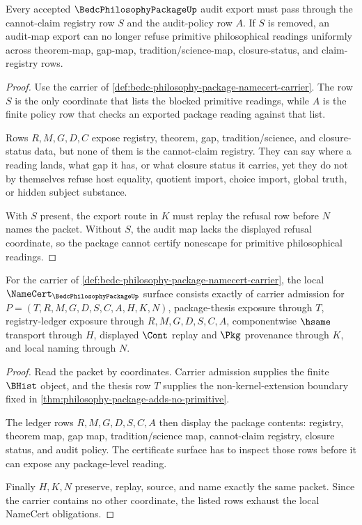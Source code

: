 \begin{theorem}
\label{thm:bedc-philosophy-package-audit-map-nonescape}
Every accepted $\BedcPhilosophyPackageUp$ audit export must pass through the cannot-claim registry row $S$ and the audit-policy row $A$. If $S$ is removed, an audit-map export can no longer refuse primitive philosophical readings uniformly across theorem-map, gap-map, tradition/science-map, closure-status, and claim-registry rows.
\end{theorem}
\begin{proof}
Use the carrier of \autoref{def:bedc-philosophy-package-namecert-carrier}. The row $S$ is the only coordinate that lists the blocked primitive readings, while $A$ is the finite policy row that checks an exported package reading against that list.

Rows $R,M,G,D,C$ expose registry, theorem, gap, tradition/science, and closure-status data, but none of them is the cannot-claim registry. They can say where a reading lands, what gap it has, or what closure status it carries, yet they do not by themselves refuse host equality, quotient import, choice import, global truth, or hidden subject substance.

With $S$ present, the export route in $K$ must replay the refusal row before $N$ names the packet. Without $S$, the audit map lacks the displayed refusal coordinate, so the package cannot certify nonescape for primitive philosophical readings.
\end{proof}

\begin{theorem}
\label{thm:bedc-philosophy-package-namecert-obligations}
For the carrier of \autoref{def:bedc-philosophy-package-namecert-carrier}, the local $\NameCert_{\BedcPhilosophyPackageUp}$ surface consists exactly of carrier admission for $P=(T,R,M,G,D,S,C,A,H,K,N)$, package-thesis exposure through $T$, registry-ledger exposure through $R,M,G,D,S,C,A$, componentwise $\hsame$ transport through $H$, displayed $\Cont$ replay and $\Pkg$ provenance through $K$, and local naming through $N$.
\end{theorem}
\begin{proof}
Read the packet by coordinates. Carrier admission supplies the finite $\BHist$ object, and the thesis row $T$ supplies the non-kernel-extension boundary fixed in \autoref{thm:philosophy-package-adds-no-primitive}.

The ledger rows $R,M,G,D,S,C,A$ then display the package contents: registry, theorem map, gap map, tradition/science map, cannot-claim registry, closure status, and audit policy. The certificate surface has to inspect those rows before it can expose any package-level reading.

Finally $H,K,N$ preserve, replay, source, and name exactly the same packet. Since the carrier contains no other coordinate, the listed rows exhaust the local NameCert obligations.
\end{proof}


